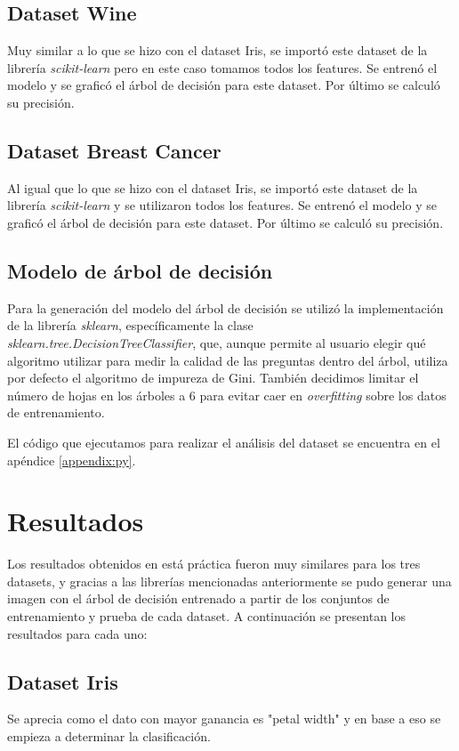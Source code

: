 \documentclass[sigconf,authorversion,nonacm]{acmart}
\begin{document}
\subsection{Dataset Wine}
Muy similar a lo que se hizo con el dataset Iris, se importó este dataset de la librería \textit{scikit-learn} pero en este caso tomamos todos los features.
Se entrenó el modelo y se graficó el árbol de decisión para este dataset.
Por último se calculó su precisión.


\subsection{Dataset Breast Cancer}
Al igual que lo que se hizo con el dataset Iris, se importó este dataset de la librería \textit{scikit-learn} y se utilizaron todos los features.
Se entrenó el modelo y se graficó el árbol de decisión para este dataset.
Por último se calculó su precisión.


\subsection{Modelo de árbol de decisión}
Para la generación del modelo del árbol de decisión se utilizó la implementación de la librería \textit{sklearn}, específicamente la clase \\\textit{sklearn.tree.DecisionTreeClassifier}\cite{scikit-learn}, que, aunque permite al usuario elegir qué algoritmo utilizar para medir la calidad de las preguntas dentro del árbol, utiliza por defecto el algoritmo de impureza de Gini. También decidimos limitar el número de hojas en los árboles a 6 para evitar caer en \textit{overfitting} sobre los datos de entrenamiento.

El código que ejecutamos para realizar el análisis del dataset se encuentra en el apéndice \ref{appendix:py}.


\section{Resultados}
Los resultados obtenidos en está práctica fueron muy similares para los tres datasets, y gracias a las librerías mencionadas anteriormente se pudo generar una imagen con el árbol de decisión entrenado a partir de los conjuntos de entrenamiento y prueba de cada dataset.
A continuación se presentan los resultados para cada uno:


\subsection{Dataset Iris}
Se aprecia como el dato con mayor ganancia es "petal width" y en base a eso se empieza a determinar la clasificación.
\end{document}
